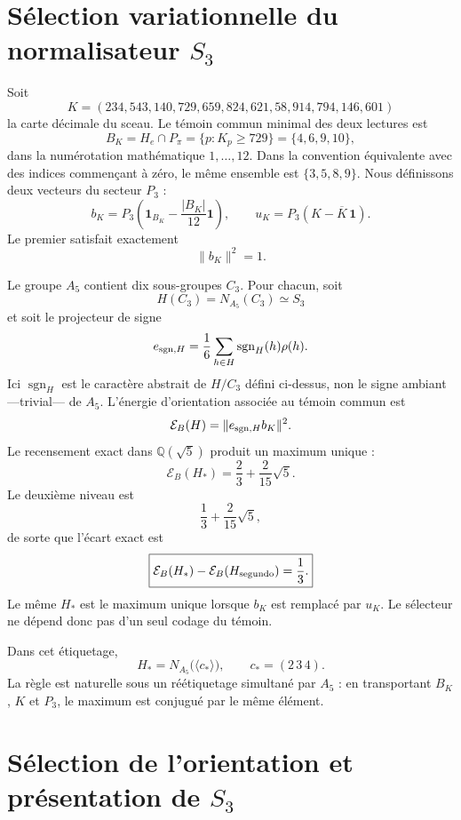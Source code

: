 \section{Sélection variationnelle du normalisateur \texorpdfstring{\(S_3\)}{S3}}

Soit
\[
 K=(234,543,140,729,659,824,621,58,914,794,146,601)
\]
la carte décimale du sceau. Le témoin commun minimal des deux lectures est
\[
 B_K=H_e\cap P_\pi
 =\{p:K_p\ge729\}
 =\{4,6,9,10\},
\]
dans la numérotation mathématique \(1,\ldots,12\). Dans la convention équivalente
avec des indices commençant à zéro, le même ensemble est \(\{3,5,8,9\}\). Nous définissons deux
vecteurs du secteur \(P_3\) :
\[
 b_K=P_3\left(\mathbf1_{B_K}-\frac{|B_K|}{12}\mathbf1\right),
 \qquad
 u_K=P_3\left(K-\overline K\,\mathbf1\right).
\]
Le premier satisfait exactement
\[
 \|b_K\|^2=1.
\]

Le groupe \(A_5\) contient dix sous-groupes \(C_3\). Pour chacun, soit
\[
 H(C_3)=N_{A_5}(C_3)\simeq S_3
\]
et soit le projecteur de signe
\[
 e_{{\rm sgn},H}
 =\frac16\sum_{h\in H}\operatorname{sgn}_H(h)\rho(h).
\]
Ici \(\operatorname{sgn}_H\) est le caractère abstrait de \(H/C_3\)
défini ci-dessus, non le signe ambiant —trivial— de \(A_5\).
L'énergie d'orientation associée au témoin commun est
\[
 \mathcal E_B(H)=\|e_{{\rm sgn},H}b_K\|^2.
\]
Le recensement exact dans \(\mathbb Q(\sqrt5)\) produit un maximum unique :
\[
 \mathcal E_B(H_*)
 =\frac23+\frac{2}{15}\sqrt5.
\]
Le deuxième niveau est
\[
 \frac13+\frac{2}{15}\sqrt5,
\]
de sorte que l'écart exact est
\[
 \boxed{\mathcal E_B(H_*)-\mathcal E_B(H_{\rm segundo})=\frac13.}
\]
Le même \(H_*\) est le maximum unique lorsque \(b_K\) est remplacé par \(u_K\).
Le sélecteur ne dépend donc pas d'un seul codage du témoin.

Dans cet étiquetage,
\[
 H_*=N_{A_5}\bigl(\langle c_*\rangle\bigr),
\qquad
 c_*=(2\,3\,4).
\]
La règle est naturelle sous un réétiquetage simultané par \(A_5\) : en
transportant \(B_K\), \(K\) et \(P_3\), le maximum est conjugué par le même
élément.

\section{Sélection de l'orientation et présentation de \texorpdfstring{\(S_3\)}{S3}}

